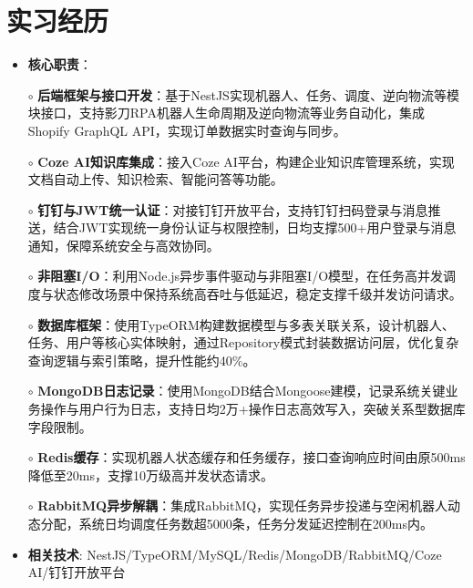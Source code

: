 \section{实习经历}
  \begin{normalsize}
    \begin{itemize}
    \item \textbf{核心职责}：
    \setlength{\itemindent}{1em} %
      \item[$\circ$] \textbf{后端框架与接口开发}：基于NestJS实现机器人、任务、调度、逆向物流等模块接口，支持影刀RPA机器人生命周期及逆向物流等业务自动化，集成Shopify GraphQL API，实现订单数据实时查询与同步。
      \item[$\circ$] \textbf{Coze AI知识库集成}：接入Coze AI平台，构建企业知识库管理系统，实现文档自动上传、知识检索、智能问答等功能。
      \item[$\circ$] \textbf{钉钉与JWT统一认证}：对接钉钉开放平台，支持钉钉扫码登录与消息推送，结合JWT实现统一身份认证与权限控制，日均支撑500+用户登录与消息通知，保障系统安全与高效协同。
      \item[$\circ$] \textbf{非阻塞I/O}：利用Node.js异步事件驱动与非阻塞I/O模型，在任务高并发调度与状态修改场景中保持系统高吞吐与低延迟，稳定支撑千级并发访问请求。
      \item[$\circ$] \textbf{数据库框架}：使用TypeORM构建数据模型与多表关联关系，设计机器人、任务、用户等核心实体映射，通过Repository模式封装数据访问层，优化复杂查询逻辑与索引策略，提升性能约40\%。
      \item[$\circ$] \textbf{MongoDB日志记录}：使用MongoDB结合Mongoose建模，记录系统关键业务操作与用户行为日志，支持日均2万+操作日志高效写入，突破关系型数据库字段限制。
      \item[$\circ$] \textbf{Redis缓存}：实现机器人状态缓存和任务缓存，接口查询响应时间由原500ms降低至20ms，支撑10万级高并发状态请求。
      \item[$\circ$] \textbf{RabbitMQ异步解耦}：集成RabbitMQ，实现任务异步投递与空闲机器人动态分配，系统日均调度任务数超5000条，任务分发延迟控制在200ms内。
    \setlength{\itemindent}{0em} %
    \item \textbf{相关技术}: NestJS/TypeORM/MySQL/Redis/MongoDB/RabbitMQ/Coze AI/钉钉开放平台
    \end{itemize}
  \end{normalsize}
